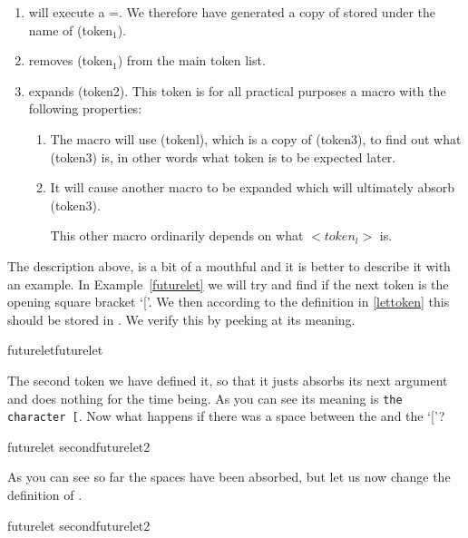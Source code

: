 \begin{enumerate}
\item  \tex will execute a \cmd{\let}=.
We therefore have generated a copy of 
stored under the name of (token$_1$).\label{lettoken}

\item  removes (token$_1$) from the main token list.

\item \tex expands (token2). This token is for all
practical purposes a macro with the following
properties:

\begin{enumerate}
\item The macro will use (tokenl), which is a
copy of (token3), to find out what (token3)
is, in other words what token is to be
expected later.
\item It will cause another macro to be expanded
which will ultimately absorb (token3).

This other macro ordinarily depends on
what $<token_l>$ is.
\end{enumerate}
\end{enumerate}

The description above, is a bit of a mouthful and it is better to describe it with an example. In Example~\ref{futurelet} we will try and find if the next token is the opening square bracket `['. We then according to the definition in \ref{lettoken} this should be stored in . We verify this by peeking at its meaning.

\begin{texexample}{futurelet}{futurelet}
\def\tokentwo#1{}
\futurelet\tokenone\tokentwo[
\meaning\tokenone
\end{texexample}

The second token  we have defined it, so that it justs absorbs its next argument and does nothing for the time being. As you can see its meaning is \texttt{the character [}. Now what happens if there was a space between the  and the `['?

\begin{texexample}{futurelet second}{futurelet2}
\def\tokentwo#1{}
\futurelet\tokenone\tokentwo     [
\meaning\tokenone
\end{texexample}

As you can see so far the spaces have been absorbed, but let us now change the definition of .

\begin{texexample}{futurelet second}{futurelet2}
\def\tokentwo#1{}
\futurelet\tokenone\tokentwo     
\meaning\tokenone
\end{texexample}



